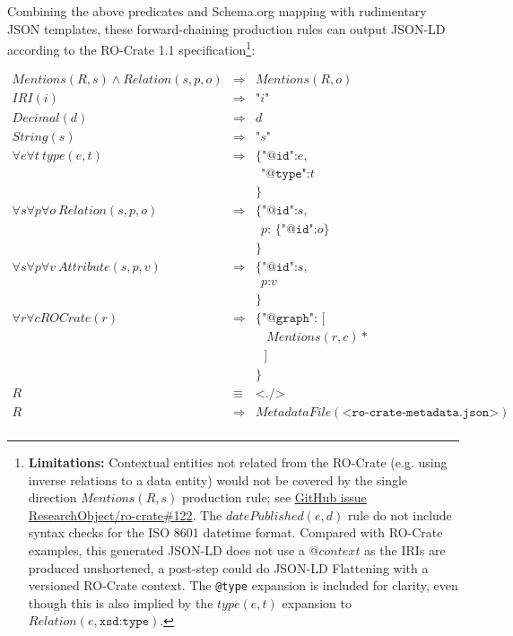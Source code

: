 Combining the above predicates and Schema.org mapping with rudimentary JSON templates, these forward-chaining production rules can output JSON-LD according to the RO-Crate 1.1 specification\footnote{
    \textbf{Limitations:} Contextual entities not related from the RO-Crate (e.g. using inverse relations to a data entity) would not be covered by the single direction $Mentions(R, s)$ production rule; see \href{https://github.com/ResearchObject/ro-crate/issues/122}{GitHub issue ResearchObject/ro-crate\#122}. The $datePublished(e, d)$ rule do not include syntax checks for the ISO 8601 datetime format. Compared with RO-Crate examples, this generated JSON-LD does not use a $@context$ as the IRIs are produced unshortened, a post-step could do JSON-LD Flattening with a versioned RO-Crate context. The \texttt{@type} expansion is included for clarity, even though this is also implied by the $type(e, t)$ expansion to $Relation(e, \texttt{xsd:type})$.
}:

\small
\begin{eqnarray*}
Mentions(R, s) \land Relation(s,p,o)
                        & \Rightarrow & Mentions(R, o) \\
IRI(i)                  & \Rightarrow & \texttt{"} i \texttt{"} \\
Decimal(d)              & \Rightarrow & d \\
String(s)               & \Rightarrow & \texttt{"} s \texttt{"} \\
\forall e \forall t
\ type(e, t)            & \Rightarrow & \texttt{\{"@id":}  e \texttt{,} \\
&&                               \ \  \texttt{"@type":} t \\
&&                              \texttt{\}} \\
\forall s \forall p \forall o
\ Relation(s,p,o)
                        & \Rightarrow &  \texttt{\{"@id":}  s \texttt{,} \\
&&                               \ \  p \texttt{: \{ "@id":} o \texttt{\}} \\
&&                              \texttt{\}} \\
\forall s \forall p \forall v
\ Attribute(s,p,v)    & \Rightarrow &  \texttt{\{"@id":} s \texttt{,} \\
&&                               \ \ p \texttt{:} v  \\
&&                               \texttt{\}} \\
\forall r  \forall c
    ROCrate(r)      & \Rightarrow &  \texttt{\{ "@graph": [} \\
&& \ \ \ \ Mentions(r, c)* \\
&& \ \ \ \texttt{]} \\
&& \texttt{\}} \\
R   & \equiv & \texttt{<./>}  \\
R   & \Rightarrow &  MetadataFile(\texttt{<ro-crate-metadata.json>}) \\
\end{eqnarray*}
\normalsize

